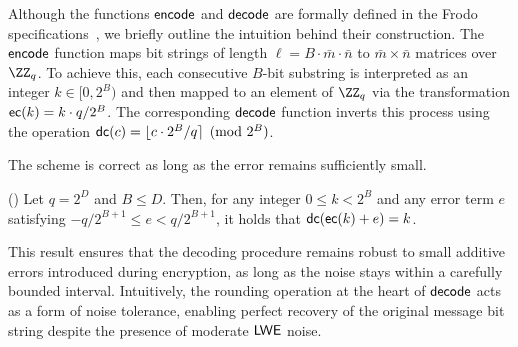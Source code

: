 \documentclass{fundam}
\begin{document}
 \vspace{0.5cm}
Although the functions $\mathsf{encode}$ and $\mathsf{decode}$ are formally defined in the Frodo specifications~\cite{Frodo, Frodo2}, we briefly outline the intuition behind their construction. The $\mathsf{encode}$ function maps bit strings of length $\ell = B \cdot \bar{m} \cdot \bar{n}$ to $\bar{m} \times \bar{n}$ matrices over $\ZZ_q$. To achieve this, each consecutive $B$-bit substring is interpreted as an integer $k \in [0, 2^B)$ and then mapped to an element of $\ZZ_q$ via the transformation $\mathsf{ec}(k) = k \cdot q / 2^B$. The corresponding $\mathsf{decode}$ function inverts this process using the operation $\mathsf{dc}(c) = \lfloor c \cdot 2^B / q \rceil \pmod{2^B}$.

The scheme is correct as long as the error remains sufficiently small.
\begin{lemma}(\cite{Frodo})\label{lem::01}
Let $q = 2^{D}$ and $B \leq D$. Then, for any integer $0 \leq k < 2^{B}$ and any error term $e$ satisfying $-q/2^{B+1} \leq e < q/2^{B+1}$, it holds that $\mathsf{dc}(\mathsf{ec}(k) + e) = k$.
\end{lemma}	

This result ensures that the decoding procedure remains robust to small additive errors introduced during encryption, as long as the noise stays within a carefully bounded interval. Intuitively, the rounding operation at the heart of $\mathsf{decode}$ acts as a form of noise tolerance, enabling perfect recovery of the original message bit string despite the presence of moderate $\mathsf{LWE}$ noise.

%
\end{document}
